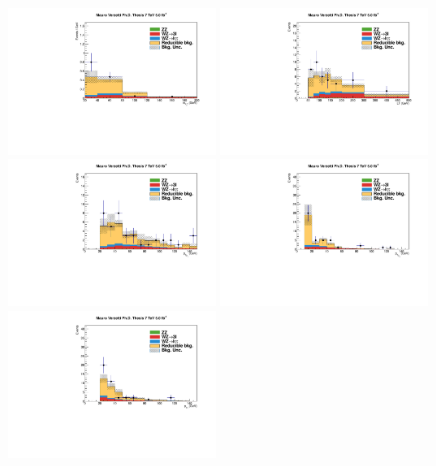 \begin{figure}
\begin{center}
  \includegraphics[width=0.49\textwidth]{4_Analisys/pics/7TeV/plots/mmt/f3/Full/final-f3-subMass-Full.pdf}
  \includegraphics[width=0.49\textwidth]{4_Analisys/pics/7TeV/plots/mmt/f3/final-LT.pdf}\\
  \includegraphics[width=0.49\textwidth]{4_Analisys/pics/7TeV/plots/mmt/f3/Full/final-f3-m1Pt-Full.pdf}
  \includegraphics[width=0.49\textwidth]{4_Analisys/pics/7TeV/plots/mmt/f3/Full/final-f3-m2Pt-Full.pdf}\\
  \includegraphics[width=0.49\textwidth]{4_Analisys/pics/7TeV/plots/mmt/f3/Full/final-f3-tPt-Full.pdf}

\end{center}
\end{figure}

